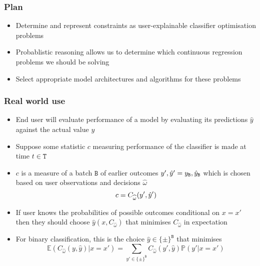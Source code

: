 \documentclass{beamer}
\newcommand{\TWO}{\{\pm\}}
\newcommand{\BATCH}{{\texttt{B}}}
\newcommand{\Feature}{{x}}
\newcommand{\Target}{{y}}
\newcommand{\FeatureD}{{x'}}
\newcommand{\TargetD}{{y'}}
\newcommand{\TIMES}{{\texttt T}}
\newcommand{\Phase}{{\omega}}
\newcommand{\PhaseK}{{\widehat\Phase}}
\newcommand{\SCORE}{{C}}
\newcommand{\Score}{{c}}
\newcommand{\Pred}[1][y]{{\hat{#1}}}
\newcommand{\PredD}[1][y]{{\hat{#1}'}}
\begin{document}
\begin{frame}
\frametitle{Plan}
\begin{itemize}
  \item
    Determine and represent constraints as user-explainable classifier optimisation problems
  \item
    Probablistic reasoning allows us to determine which continuous regression problems we should be solving
  \item
    Select appropriate model architectures and algorithms for these problems
  \end{itemize}
\end{frame}
\begin{frame}
\frametitle{Real world use}
  \begin{itemize}
  \item
    End user will evaluate performance of a model by evaluating its predictions $\Pred$ against the actual value $\Target$
  \item
    Suppose some statistic $\Score$ measuring performance of the classifier is made at time $t\in\TIMES$
  \item
    $\Score$ is a measure of a batch $\BATCH$ of earlier outcomes $\TargetD,\PredD=\REST[\Target],\REST[\Pred]$ which is chosen based on user observations and decisions $\PhaseK$
      $$
      \Score=\REST[\SCORE][\PhaseK](\TargetD,\PredD)
      $$
  \item
    If user knows the probabilities of possible outcomes conditional on $\Feature=\FeatureD$ then they should choose $\Pred(\Feature,\SCORE_{\PhaseK})$ that minimises $\SCORE_{\PhaseK}$ in expectation
  \item
    For binary classification, this is the choice $\Pred\in\TWO^{\BATCH}$ that minimises
      $$
      \mathbb E(\SCORE_{\PhaseK}(\Target,\Pred)|\Feature=\FeatureD)=\sum_{\TargetD\in\TWO^{\BATCH}}\SCORE_{\PhaseK}(\TargetD,\Pred)\mathbb P(\TargetD|\Feature=\FeatureD)
      $$
  \end{itemize}
  \end{frame}
\end{document}
